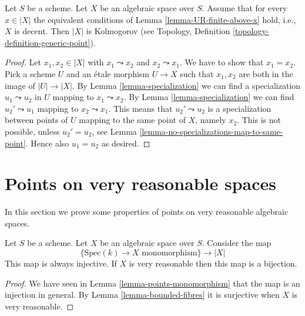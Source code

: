 \begin{lemma}
\label{lemma-kolmogorov}
Let $S$ be a scheme.
Let $X$ be an algebraic space over $S$.
Assume that for every $x \in |X|$ the equivalent conditions
of Lemma \ref{lemma-UR-finite-above-x} hold, i.e., $X$ is decent.
Then $|X|$ is Kolmogorov (see
Topology, Definition \ref{topology-definition-generic-point}).
\end{lemma}

\begin{proof}
Let $x_1, x_2 \in |X|$ with $x_1 \leadsto x_2$ and $x_2 \leadsto x_1$.
We have to show that $x_1 = x_2$. Pick a scheme $U$ and an \'etale morphism
$U \to X$ such that $x_1, x_2$ are both in the image of $|U| \to |X|$.
By Lemma \ref{lemma-specialization} we can find a specialization
$u_1 \leadsto u_2$ in $U$ mapping to $x_1 \leadsto x_2$.
By Lemma \ref{lemma-specialization} we can find
$u_2' \leadsto u_1$ mapping to $x_2 \leadsto x_1$. This means that
$u_2' \leadsto u_2$ is a specialization between points of $U$ mapping to
the same point of $X$, namely $x_2$. This is not possible, unless
$u_2' = u_2$, see
Lemma \ref{lemma-no-specializations-map-to-same-point}. Hence
also $u_1 = u_2$ as desired.
\end{proof}
















\section{Points on very reasonable spaces}
\label{section-points-very-reasonable}

\noindent
In this section we prove some properties of points on
very reasonable algebraic spaces.

\begin{lemma}
\label{lemma-very-reasonable-points-monomorphism}
Let $S$ be a scheme. Let $X$ be an algebraic space over $S$.
Consider the map
$$
\{\text{Spec}(k) \to X \text{ monomorphism}\}
\longrightarrow
|X|
$$
This map is always injective. If $X$ is very reasonable then this map
is a bijection.
\end{lemma}

\begin{proof}
We have seen in Lemma \ref{lemma-points-monomorphism}
that the map is an injection in general.
By Lemma \ref{lemma-bounded-fibres} it is surjective when $X$ is
very reasonable.
\end{proof}

